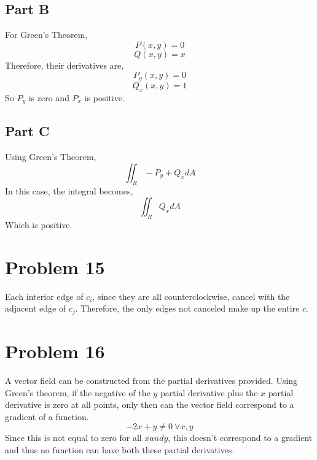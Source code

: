 \documentclass{article}
\begin{document}
\subsection*{Part B}

For Green's Theorem,
$$ P(x,y) = 0 $$
$$ Q(x,y) = x $$
Therefore, their derivatives are,
$$ P_y(x,y) = 0 $$
$$ Q_x(x,y) = 1 $$
So $P_y$ is zero and $P_x$ is positive.

\subsection*{Part C}

Using Green's Theorem,
$$ \iint_R -P_y + Q_x dA $$
In this case, the integral becomes,
$$ \iint_R Q_x dA $$
Which is positive.

\section*{Problem 15}

Each interior edge of $c_i$, since they are all counterclockwise,
cancel with the adjacent edge of $c_j$. Therefore, the only edges not
canceled make up the entire $c$.

\section*{Problem 16}

A vector field can be constructed from the partial
derivatives provided. Using Green's theorem, if the negative of the $y$ partial
derivative plus the $x$ partial derivative is zero at all points, only then can
the vector field correspond to a gradient of a function.
$$ -2x + y \neq 0\ \forall x,y $$
Since this is not equal to zero for all $x and y$, this doesn't correspond to a
gradient and thus no function can have both these partial derivatives.
\end{document}
